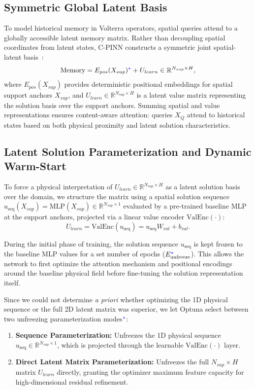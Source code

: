 \subsection{Symmetric Global Latent Basis}
To model historical memory in Volterra operators, spatial queries attend to a globally accessible latent memory matrix. Rather than decoupling spatial coordinates from latent states, C-PINN constructs a symmetric joint spatial-latent basis~\cite{jaegle2021perceiverio}:
\begin{equation}
    \text{Memory} = E_{pos}(X_{sup})^{\textcolor{blue}{\star}} + U_{learn} \in \mathbb{R}^{N_{sup} \times H},
    \label{eq:latent_basis}
\end{equation}
where $E_{pos}(X_{sup})$ provides deterministic positional embeddings for spatial support anchors $X_{sup}$, and $U_{learn} \in \mathbb{R}^{N_{sup} \times H}$ is a latent value matrix representing the solution basis over the support anchors. Summing spatial and value representations ensures content-aware attention: queries $X_Q$ attend to historical states based on both physical proximity and latent solution characteristics.

\subsection{Latent Solution Parameterization and Dynamic Warm-Start}
To force a physical interpretation of $U_{learn} \in \mathbb{R}^{N_{sup} \times H}$ as a latent solution basis over the domain, we structure the matrix using a spatial solution sequence $u_{\text{seq}}(X_{sup}) = \text{MLP}(X_{sup}) \in \mathbb{R}^{N_{sup} \times 1}$ evaluated by a pre-trained baseline MLP at the support anchors, projected via a linear value encoder $\text{ValEnc}(\cdot)$:
\begin{equation}
    U_{learn} = \text{ValEnc}(u_{\text{seq}}) = u_{\text{seq}} W_{val} + b_{val}.
\end{equation}

During the initial phase of training, the solution sequence $u_{\text{seq}}$ is kept frozen to the baseline MLP values for a set number of epochs ($E_{\text{unfreeze}}^{\textcolor{blue}{\star}}$). This allows the network to first optimize the attention mechanism and positional encodings around the baseline physical field before fine-tuning the solution representation itself.

Since we could not determine \textit{a priori} whether optimizing the 1D physical sequence or the full 2D latent matrix was superior, we let Optuna select between two unfreezing parameterization modes$^{\textcolor{blue}{\star}}$:
\begin{enumerate}
    \item \textbf{Sequence Parameterization:} Unfreezes the 1D physical sequence $u_{\text{seq}} \in \mathbb{R}^{N_{sup} \times 1}$, which is projected through the learnable $\text{ValEnc}(\cdot)$ layer.
    \item \textbf{Direct Latent Matrix Parameterization:} Unfreezes the full $N_{sup} \times H$ matrix $U_{learn}$ directly, granting the optimizer maximum feature capacity for high-dimensional residual refinement.
\end{enumerate}

